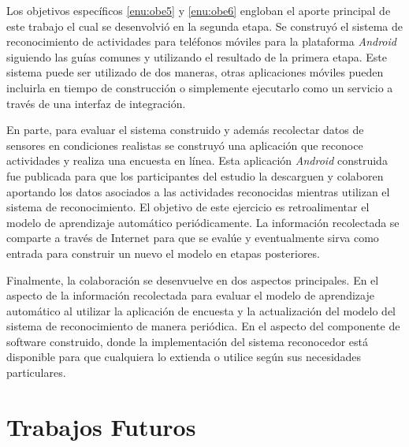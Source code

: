 Los objetivos específicos \ref{enu:obe5} y \ref{enu:obe6} engloban
el aporte principal de este trabajo el cual se desenvolvió en la segunda
etapa. Se construyó el sistema de reconocimiento de actividades para
teléfonos móviles para la plataforma \emph{Android} siguiendo las
guías comunes y utilizando el resultado de la primera etapa. Este
sistema puede ser utilizado de dos maneras, otras aplicaciones móviles
pueden incluirla en tiempo de construcción o simplemente ejecutarlo
como un servicio a través de una interfaz de integración\cite{hardroid2016a}.

En parte, para evaluar el sistema construido y además recolectar datos
de sensores en condiciones realistas se construyó una aplicación que
reconoce actividades y realiza una encuesta en línea. Esta aplicación
\emph{Android} construida fue publicada para que los participantes
del estudio la descarguen y colaboren aportando los datos asociados
a las actividades reconocidas mientras utilizan el sistema de reconocimiento.
El objetivo de este ejercicio es retroalimentar el modelo de aprendizaje
automático periódicamente. La información recolectada se comparte
a través de Internet para que se evalúe y eventualmente sirva como
entrada para construir un nuevo el modelo en etapas posteriores.

Finalmente, la colaboración se desenvuelve en dos aspectos principales.
En el aspecto de la información recolectada para evaluar el modelo
de aprendizaje automático al utilizar la aplicación de encuesta y
la actualización del modelo del sistema de reconocimiento de manera
periódica. En el aspecto del componente de software construido, donde
la implementación del sistema reconocedor está disponible para que
cualquiera lo extienda o utilice según sus necesidades particulares\cite{hardroid2016b}.

\section{Trabajos Futuros}

\label{trabajos-futuros}

